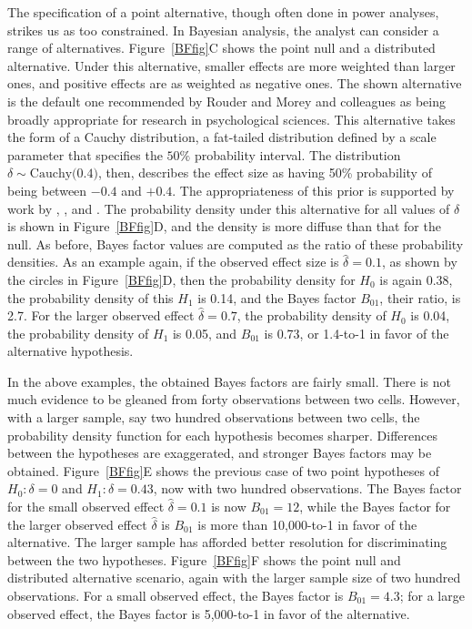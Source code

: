 \documentclass[man]{apa6}
\begin{document}
The specification of a point alternative, though often done in power analyses, strikes us as too constrained.  In Bayesian analysis, the analyst can consider a range of alternatives.  Figure~\ref{BFfig}C shows the point null and a distributed alternative.  Under this alternative, smaller effects are more weighted than larger ones, and positive effects are as weighted as negative ones.  The shown alternative is the default one recommended by Rouder and Morey and colleagues \citep{Rouder:etal:2009a,Morey:Rouder:2011,Rouder:Morey:2012,Rouder:etal:2012} as being broadly appropriate for research in psychological sciences. This alternative takes the form of a Cauchy distribution, a fat-tailed distribution defined by a scale parameter that specifies the $50\%$ probability interval. The distribution $\delta \sim \mbox{Cauchy(0.4)}$, then, describes the effect size as having 50\% probability of being between $-0.4$ and $+0.4$. 
The appropriateness of this prior is supported by work by \citet{Jeffreys:1961}, \citet{Liang:etal:2008}, and \citet{Zellner:Siow:1980}. 
The probability density under this alternative for all values of $\hat{\delta}$ is shown in Figure~\ref{BFfig}D, and the density is more diffuse than that for the null. As before, Bayes factor values are computed as the ratio of these probability densities. As an example again, if the observed effect size is $\hat{\delta} = 0.1$, as shown by the circles in Figure~\ref{BFfig}D, then the probability density for $H_0$ is again 0.38, the probability density of this $H_1$ is 0.14, and the Bayes factor $B_{01}$, their ratio, is 2.7. For the larger observed effect $\hat{\delta} = 0.7$, the probability density of $H_0$ is 0.04, the probability density of $H_1$ is 0.05, and $B_{01}$ is 0.73, or 1.4-to-1 in favor of the alternative hypothesis. 

In the above examples, the obtained Bayes factors are fairly small. There is not much evidence to be gleaned from forty observations between two cells. However, with a larger sample, say two hundred observations between two cells, the probability density function for each hypothesis becomes sharper. Differences between the hypotheses are exaggerated, and stronger Bayes factors may be obtained. Figure~\ref{BFfig}E shows the previous case of two point hypotheses of $H_0: \delta = 0$ and $H_1: \delta = 0.43$, now with two hundred observations. The Bayes factor for the small observed effect $\hat{\delta} = 0.1$ is now $B_{01} = 12$, while the Bayes factor for the larger observed effect $\hat{\delta}$ is $B_{01}$ is more than 10,000-to-1 in favor of the alternative. The larger sample has afforded better resolution for discriminating between the two hypotheses. Figure~\ref{BFfig}F shows the point null and distributed alternative scenario, again with the larger sample size of two hundred observations. For a small observed effect, the Bayes factor is $B_{01} = 4.3$; for a large observed effect, the Bayes factor is 5,000-to-1 in favor of the alternative.
\end{document}
